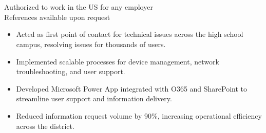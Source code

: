 {\begin{minipage}[t]{13.5cm}
\begin{minipage}[t]{6.5cm}
      \hfill{}\\
      \par\medskip
      \hfill{}\\
      \hfill{}\\
      \hfill{}\\
      \hfill{}\\
      \hfill{}\\
      \hfill{}\\
    \end{minipage}
    \par\bigskip
    \par\bigskip
    \begin{minipage}{13.5cm}
      \begin{center}
        Authorized to work in the US for any employer\\
        References available upon request
      \end{center}
    \end{minipage}
  \end{minipage}
}
\makecvheader

\par\bigskip
{}
\par\smallskip
\begin{minipage}{13.75cm}
  \begin{minipage}{6.5cm}
    \begin{itemize}
      \item Acted as first point of contact for technical issues across the high school campus, resolving issues for thousands of users.
      \item Implemented scalable processes for device management, network troubleshooting, and user support.
    \end{itemize}
  \end{minipage}
  \hfill
  \begin{minipage}{6.5cm}
    \begin{itemize}
      \item Developed Microsoft Power App integrated with O365 and SharePoint to streamline user support and information delivery.
      \item Reduced information request volume by 90\%, increasing operational efficiency across the district.
    \end{itemize}
  \end{minipage}
\end{minipage}
\par\smallskip
\divider

